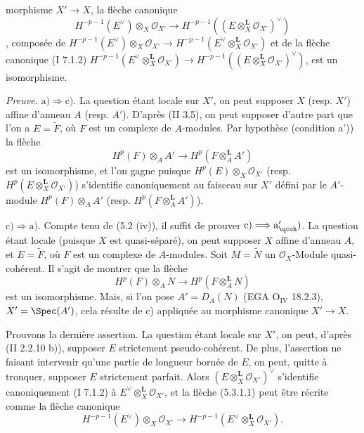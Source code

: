 morphisme \(X'\to X\), la flèche canonique
\begin{equation}
 H^{-p-1}(E^{\vee})\otimes_X\mathcal O_{X'}\longrightarrow H^{-p-1}((E\otimes_X^{\mathbf L}\mathcal O_{X'})^{\vee})\tag{5.3.1.1}
\end{equation}
, composée de \(H^{-p-1}(E^{\vee})\otimes_X\mathcal O_{X'}\longrightarrow H^{-p-1}(E^{\vee}\otimes_X^{\mathbf L}\mathcal O_{X'})\) et de la flèche canonique (I 7.1.2) \(H^{-p-1}(E^{\vee}\otimes_X^{\mathbf L}\mathcal O_{X'})\longrightarrow H^{-p-1}((E\otimes_X^{\mathbf L}\mathcal O_{X'})^{\vee})\), est un isomorphisme.

\emph{Preuve.} \(\mathrm a)\Longrightarrow\mathrm c)\). La question étant locale sur \(X'\), on peut supposer \(X\) (resp. \(X'\)) affine d'anneau \(A\) (resp. \(A'\)). D'après (II 3.5), on peut supposer d'autre part que l'on a \(E=\widetilde F\), où \(F\) est un complexe de \(A\)-modules. Par hypothèse (condition a')) la flèche
\[
 H^p(F)\otimes_A A'\longrightarrow H^p(F\otimes_A^{\mathbf L}A')
\]
est un isomorphisme, et l'on gagne puisque \(H^p(E)\otimes_X\mathcal O_{X'}\) (resp. \(H^p(E\otimes_X^{\mathbf L}\mathcal O_{X'})\)) s'identifie canoniquement au faisceau sur \(X'\) défini par le \(A'\)-module \(H^p(F)\otimes_A A'\) (resp. \(H^p(F\otimes_A^{\mathbf L}A')\)).

\(\mathrm c)\Longrightarrow\mathrm a)\). Compte tenu de (5.2 (iv)), il suffit de prouver \(\mathrm c)\Longrightarrow\mathrm a'_{\qcoh})\). La question étant locale (puisque \(X\) est quasi-séparé), on peut supposer \(X\) affine d'anneau \(A\), et \(E=\widetilde F\), où \(F\) est un complexe de \(A\)-modules. Soit \(M=\widetilde N\) un \(\mathcal O_X\)-Module quasi-cohérent. Il s'agit de montrer que la flèche
\[
 H^p(F)\otimes_A N\longrightarrow H^p(F\otimes_A^{\mathbf L}N)
\]
est un isomorphisme. Mais, si l'on pose \(A'=D_A(N)\) (EGA \(\mathrm O_{\mathrm{IV}}\) 18.2.3), \(X'=\Spec(A')\), cela résulte de c) appliquée au morphisme canonique \(X'\to X\).

Prouvons la dernière assertion. La question étant locale sur \(X'\), on peut, d'après (II 2.2.10 b)), supposer \(E\) strictement pseudo-cohérent. De plus, l'assertion ne faisant intervenir qu'une partie de longueur bornée de \(E\), on peut, quitte à tronquer, supposer \(E\) strictement parfait. Alors \((E\otimes_X^{\mathbf L}\mathcal O_{X'})^{\vee}\) s'identifie canoniquement (I 7.1.2) à \(E^{\vee}\otimes_X^{\mathbf L}\mathcal O_{X'}\), et la flèche (5.3.1.1) peut être récrite comme la flèche canonique
\begin{equation}
 H^{-p-1}(E^{\vee})\otimes_X\mathcal O_{X'}\longrightarrow H^{-p-1}(E^{\vee}\otimes_X^{\mathbf L}\mathcal O_{X'}).\tag{$*$}
\end{equation}

